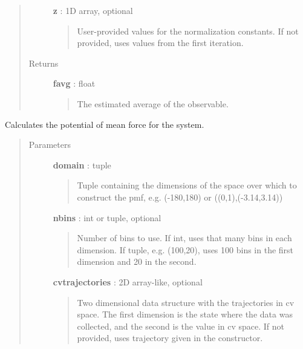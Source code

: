 \documentclass[letterpaper,10pt,english]{sphinxmanual}
\begin{document}
\begin{fulllineitems}
\begin{fulllineitems}
\begin{quote}
\begin{description}
\textbf{z} : 1D array, optional
\begin{quote}

User-provided values for the normalization constants. If not provided, uses values from the first iteration.
\end{quote}

\item[{Returns}] \leavevmode
\textbf{favg} : float
\begin{quote}

The estimated average of the observable.
\end{quote}

\end{description}\end{quote}

\end{fulllineitems}


\begin{fulllineitems}
\label{modules/emus:emus.emus.calc_pmf}
Calculates the potential of mean force for the system.
\begin{quote}\begin{description}
\item[{Parameters}] \leavevmode
\textbf{domain} : tuple
\begin{quote}

Tuple containing the dimensions of the space over which to construct the pmf, e.g. (-180,180) or ((0,1),(-3.14,3.14))
\end{quote}

\textbf{nbins} : int or tuple, optional
\begin{quote}

Number of bins to use.  If int, uses that many bins in each dimension.  If tuple, e.g. (100,20), uses 100 bins in the first dimension and 20 in the second.
\end{quote}

\textbf{cvtrajectories} : 2D array-like, optional
\begin{quote}

Two dimensional data structure with the trajectories in cv space.  The first dimension is the state where the data was collected, and the second is the value in cv space.  If not provided, uses trajectory given in the constructor.
\end{quote}


\end{description}
\end{quote}
\end{fulllineitems}
\end{fulllineitems}
\end{document}
